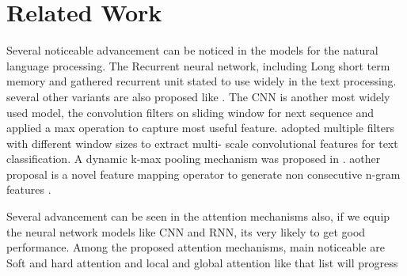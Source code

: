 \documentclass{MX2020}
\begin{document}
\section{Related Work}
Several noticeable advancement can be noticed in the models for the natural language processing. The Recurrent neural network, including Long short term memory and gathered recurrent unit stated to use widely in the text processing. several other variants are also proposed like \cite{2017b}. The CNN is another most widely used model, the convolution filters on sliding window for next sequence and applied a max operation to capture most useful feature. \cite{Kim} adopted multiple filters with different window sizes to extract multi- scale convolutional features for text classification. A dynamic k-max pooling mechanism was proposed in \cite{Blunsom}. aother proposal is a novel feature mapping 
operator to generate non consecutive n-gram features \cite{Lei}. \par
Several advancement can be seen in the attention mechanisms also, if we equip the neural network models like CNN and RNN, its very likely to get good performance. Among the proposed attention mechanisms, main noticeable are Soft and hard attention \cite{xu} and local and global attention like that list will progress
\end{document}
